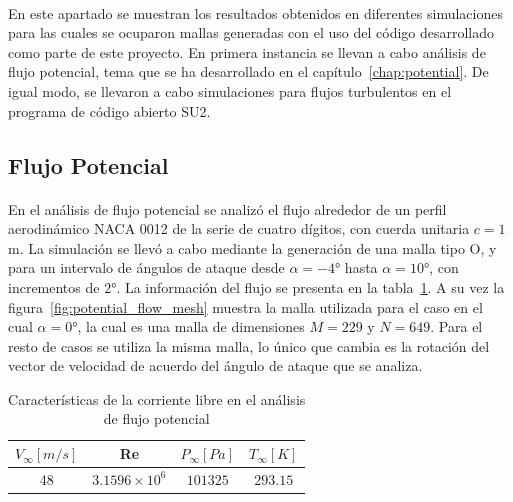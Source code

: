 \documentclass[letterpaper, openright, 12pt]{book}
\begin{document}
    \paragraph*{}
    En este apartado se muestran los resultados obtenidos en diferentes
    simulaciones para las cuales se ocuparon mallas generadas con el uso del
    código desarrollado como parte de este proyecto. En primera instancia se
    llevan a cabo análisis de flujo potencial, tema que se ha desarrollado en el
    capítulo~\ref{chap:potential}. De igual modo, se llevaron a cabo
    simulaciones para flujos turbulentos en el programa de código abierto SU2.

    \subsection{Flujo Potencial}
    \paragraph*{}
    En el análisis de flujo potencial se analizó el flujo alrededor de un perfil
    aerodinámico NACA 0012 de la serie de cuatro dígitos, con cuerda unitaria
    $c = 1$ m. La simulación se llevó a cabo mediante la generación de una malla
    tipo O, y para un intervalo de ángulos de ataque desde
    $\alpha = -4\si{\degree}$ hasta $\alpha = 10\si{\degree}$, con incrementos
    de $2\si{\degree}$. La información del flujo se presenta en la
    tabla~\ref{tabla_potencial}. A su vez la
    figura~\ref{fig:potential_flow_mesh} muestra la malla
    utilizada para el caso en el cual $\alpha = 0\si{\degree}$, la cual es una
    malla de dimensiones $M = 229$ y $N = 649$. Para el resto de casos se
    utiliza la misma malla, lo único que cambia es la rotación del vector de
    velocidad de acuerdo del ángulo de ataque que se analiza.

    \begin{table}[htbp!]
    \begin{center}
        \begin{tabular}{| c | c | c | c |}
        \hline
          $V_{\infty} [m / s]$ & Re & $P_{\infty} [Pa]$ & $T_{\infty} [K]$ \\
        \hline
          48 & $3.1596\times 10^{6}$ & $101 325$ & $293.15$ \\
        \hline
        \end{tabular}
        \caption{Características de la corriente libre en el análisis de flujo potencial}
    \label{tabla_potencial}
    \end{center}
    \end{table}
\end{document}
